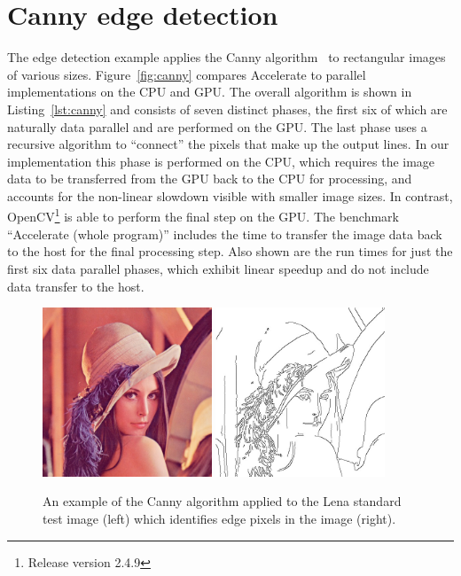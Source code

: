 \section{Canny edge detection}
\label{sec:canny}

The edge detection example applies the Canny algorithm~\cite{Canny:1986et} to
rectangular images of various sizes. Figure~\ref{fig:canny} compares Accelerate
to parallel implementations on the CPU and GPU\@. The overall algorithm is shown
in Listing~\ref{lst:canny} and consists of seven distinct phases, the first six
of which are naturally data parallel and are performed on the GPU\@. The last
phase uses a recursive algorithm to ``connect'' the pixels that make up the
output lines. In our implementation this phase is performed on the CPU, which
requires the image data to be transferred from the GPU back to the CPU for
processing, and accounts for the non-linear slowdown visible with smaller image
sizes. In contrast, OpenCV\footnote{Release version 2.4.9} is able to perform
the final step on the GPU\@. The benchmark ``Accelerate (whole program)''
includes the time to transfer the image data back to the host for the final
processing step. Also shown are the run times for just the first six data
parallel phases, which exhibit linear speedup and do not include data transfer
to the host.

\begin{figure}
    \begin{center}
        \includegraphics[width=0.45\textwidth]{images/sec-6/canny/lena}
        \includegraphics[width=0.45\textwidth]{images/sec-6/canny/lena-edges}
    \end{center}
    \caption[Example of the Canny edge detection algorithm]{An example of the
        Canny algorithm applied to the Lena standard test image (left) which
        identifies edge pixels in the image (right).}
    \label{fig:lena}
\end{figure}

